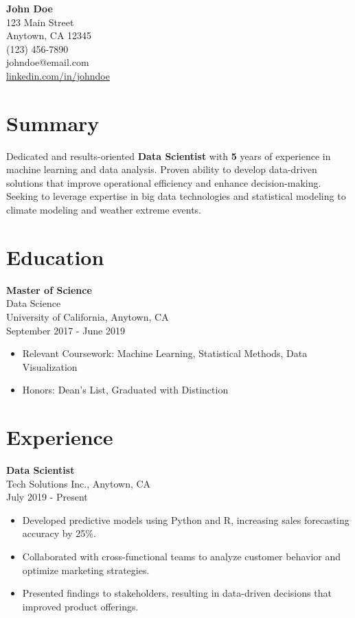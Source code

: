 \documentclass[a4paper,10pt]{article}
\begin{document}
\begin{center}
    {\LARGE \textbf{John Doe}} \\[0.5em]
    123 Main Street \\ 
    Anytown, CA 12345 \\ 
    (123) 456-7890 \\ 
    johndoe@email.com \\ 
    \href{https://linkedin.com/in/johndoe}{linkedin.com/in/johndoe}
\end{center}

\vspace{1em}

\section*{Summary}
Dedicated and results-oriented \textbf{Data Scientist} with \textbf{5} years of experience in machine learning and data analysis. Proven ability to develop data-driven solutions that improve operational efficiency and enhance decision-making. Seeking to leverage expertise in big data technologies and statistical modeling to climate modeling and weather extreme events.

\section*{Education}
\textbf{Master of Science} \\
Data Science \\
University of California, Anytown, CA \\
September 2017 - June 2019 \\
\begin{itemize}[left=0pt]
    \item Relevant Coursework: Machine Learning, Statistical Methods, Data Visualization
    \item Honors: Dean's List, Graduated with Distinction
\end{itemize}

\section*{Experience}
\textbf{Data Scientist} \\
Tech Solutions Inc., Anytown, CA \\
July 2019 - Present \\
\begin{itemize}[left=0pt]
    \item Developed predictive models using Python and R, increasing sales forecasting accuracy by 25\%.
    \item Collaborated with cross-functional teams to analyze customer behavior and optimize marketing strategies.
    \item Presented findings to stakeholders, resulting in data-driven decisions that improved product offerings.
\end{itemize}
\end{document}
